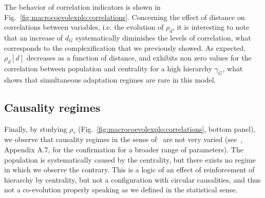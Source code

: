 The behavior of correlation indicators is shown in Fig.~\ref{fig:macrocoevolexplo:correlations}. Concerning the effect of distance on correlations between variables, i.e. the evolution of $\rho_d$, it is interesting to note that an increase of $d_G$ systematically diminishes the levels of correlation, what corresponds to the complexification that we previously showed. As expected, $\rho_d\left[d\right]$ decreases as a function of distance, and exhibits non zero values for the correlation between population and centrality for a high hierarchy $\gamma_G$, what shows that simultaneous adaptation regimes are rare in this model.


\subsection{Causality regimes}


Finally, by studying $\rho_{\tau}$ (Fig.~\ref{fig:macrocoevolexplo:correlations}, bottom panel), we observe that causality regimes in the sense of~\cite{raimbault2017identification} are not very varied (see~\cite{raimbault:tel-01857741}, Appendix A.7, for the confirmation for a broader range of parameters). The population is systematically caused by the centrality, but there exists no regime in which we observe the contrary. This is a logic of an effect of reinforcement of hierarchy by centrality, but not a configuration with circular causalities, and thus not a co-evolution properly speaking as we defined in the statistical sense.








